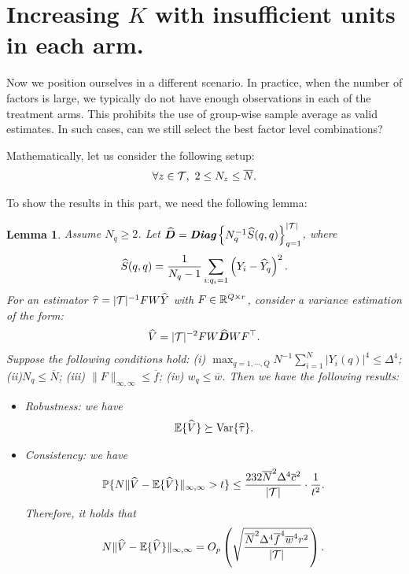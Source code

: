 \documentclass[12pt]{article}
\newtheorem{lemma}{Lemma}
\begin{document}
\section{Increasing $K$ with insufficient units in each arm.}

Now we position ourselves in a different scenario. In practice, when the number of factors is large, we typically do not have enough observations in each of the treatment arms. This prohibits the use of group-wise sample average as valid estimates. In such cases, can we still select the best factor level combinations?

Mathematically, let us consider the following setup:
\begin{align*}
    \forall z\in{\mathcal{T}}, ~2 \le N_z \le \overline{N}. 
\end{align*}

To show the results in this part, we need the following lemma:
\begin{lemma}\label{lem:variance-bD}
Assume $N_q \ge 2$. Let $\widehat{{\boldsymbol{D}}} = \text{\em\bfseries Diag}\left\{N_q^{-1}\widehat{S}(q,q)\right\}_{q=1}^{|{\mathcal{T}}|}$, where
\begin{align*}
    \widehat{S}(q,q) = \frac{1}{N_q - 1} \sum_{i:q_i=1} \left(Y_i - \widehat{Y}_q\right)^2.
\end{align*}
For an estimator ${\widehat{\tau}} = |{\mathcal{T}}|^{-1}FW\widehat{Y}$ with $F\in{\mathbb{R}}^{Q\times r}$, consider a variance estimation of the form:
\begin{align*}
    \widehat{V} = |{\mathcal{T}}|^{-2}FW \widehat{{\boldsymbol{D}}} WF^\top.
\end{align*}
Suppose the following conditions hold:  (i) $\max_{q=1,\cdots,Q} N^{-1}\sum_{i=1}^N |Y_i(q)|^4 \le \Delta^4$; (ii)$N_q \le \overline{N}$; (iii) $\|F\|_{\infty,\infty}\le \overline{f}$; (iv) $w_q \le \overline{w}$.
Then we have the following results:
\begin{itemize}
    \item Robustness: we have
    \begin{align*}
     {\mathbb{E}}\{\widehat{V}\} \succeq 
     \operatorname{Var}\{{\widehat{\tau}}\}.
    \end{align*}

    \item Consistency: we have
    \begin{align*}
        {\mathbb{P}}\{N\|\widehat{V} - {\mathbb{E}}\{\widehat{V}\}\|_{\infty,\infty}>t\}  \le 
        \frac{232\overline{N}^2\Delta^4\overline{c}^2}{|{\mathcal{T}}|}\cdot\frac{1}{t^2}.
    \end{align*}
    Therefore, it holds that
    \begin{align*}
     N\|\widehat{V} - {\mathbb{E}}\{\widehat{V}\}\|_{\infty,\infty} 
     = O_p\left(\sqrt{\frac{\overline{N}^2\Delta^4\overline{f}^4\overline{w}^4r^2}{|{\mathcal{T}}|}}\right).
    \end{align*}
    
\end{itemize}

\end{lemma}
\end{document}
